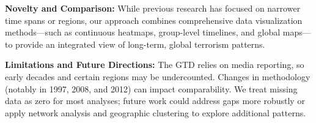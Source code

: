\vspace{1em}
\noindent
\textbf{Novelty and Comparison:}  
While previous research has focused on narrower time spans or regions, our approach combines comprehensive data visualization methods—such as continuous heatmaps, group-level timelines, and global maps—to provide an integrated view of long-term, global terrorism patterns.

\vspace{1em}
\noindent
\textbf{Limitations and Future Directions:}  
The GTD relies on media reporting, so early decades and certain regions may be undercounted. Changes in methodology (notably in 1997, 2008, and 2012) can impact comparability. We treat missing data as zero for most analyses; future work could address gaps more robustly or apply network analysis and geographic clustering to explore additional patterns.
